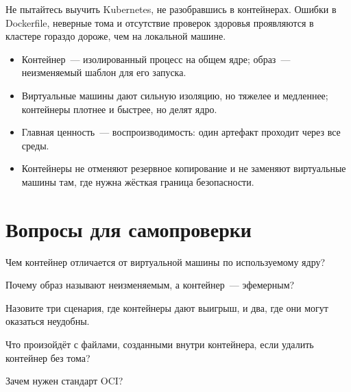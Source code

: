 \begin{tipbox}
Не пытайтесь выучить Kubernetes, не разобравшись в контейнерах. Ошибки
в Dockerfile, неверные тома и отсутствие проверок здоровья проявляются
в кластере гораздо дороже, чем на локальной машине.
\end{tipbox}

\begin{summarybox}
\begin{itemize}
  \item Контейнер~--- изолированный процесс на общем ядре; образ~---
        неизменяемый шаблон для его запуска.
  \item Виртуальные машины дают сильную изоляцию, но тяжелее и медленнее;
        контейнеры плотнее и быстрее, но делят ядро.
  \item Главная ценность~--- воспроизводимость: один артефакт проходит
        через все среды.
  \item Контейнеры не отменяют резервное копирование и не заменяют
        виртуальные машины там, где нужна жёсткая граница безопасности.
\end{itemize}
\end{summarybox}

\section*{Вопросы для самопроверки}
\begin{selfcheck}
  \item Чем контейнер отличается от виртуальной машины по используемому ядру?
  \item Почему образ называют неизменяемым, а контейнер~--- эфемерным?
  \item Назовите три сценария, где контейнеры дают выигрыш, и два, где
        они могут оказаться неудобны.
  \item Что произойдёт с файлами, созданными внутри контейнера, если
        удалить контейнер без тома?
  \item Зачем нужен стандарт OCI?
\end{selfcheck}
